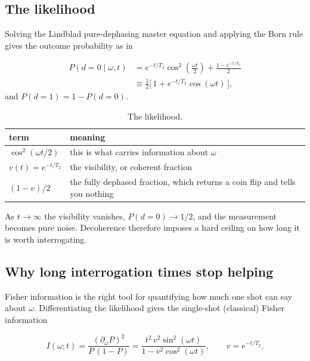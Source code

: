 \documentclass[12pt,a4paper]{article}
\begin{document}
\subsection{The likelihood}
\label{sec:the-likelihood}
Solving the Lindblad pure-dephasing master equation and applying the Born rule gives the outcome
probability as in  %

\begin{align}
P(d=0 \mid \omega, t)
  &= e^{-t/T_2}\cos^{2}\!\left(\frac{\omega t}{2}\right) + \frac{1 - e^{-t/T_2}}{2} \nonumber \\
  &\equiv \frac{1}{2}\bigl[\, 1 + e^{-t/T_2}\cos(\omega t) \,\bigr],
\label{eq:likelihood}
\end{align}
and $P(d=1) = 1 - P(d=0)$. 
\begin{table}[H]
  \centering
  \caption{The likelihood.}
  \label{tab:the-likelihood}
  \small
  \begin{tabular}{ll}
  \toprule
  term & meaning \\
  \midrule
  $\cos^2(\omega t/2)$ & this is what carries information about $\omega$ \\
  $v(t) = e^{-t/T_2}$ & the visibility, or coherent fraction \\
  $(1-v)/2$ & the fully dephased fraction, which returns a coin flip and tells you nothing \\
  \bottomrule
  \end{tabular}
\end{table}
As $t \to \infty$ the visibility vanishes, $P(d=0) \to 1/2$, and the measurement becomes pure noise.
Decoherence therefore imposes a hard ceiling on how long it is worth interrogating.




\subsection{Why long interrogation times stop helping}
\label{sec:aside-why-long-interrogation-times-stop-helping}
Fisher information is the right tool for quantifying how much one shot can say about $\omega$.
Differentiating the likelihood gives the single-shot (classical) Fisher information

\begin{equation}
I(\omega; t) = \frac{\left(\partial_\omega P\right)^2}{P\,(1-P)}
  = \frac{t^2\,v^2\sin^2(\omega t)}{1 - v^2\cos^2(\omega t)},
\qquad v = e^{-t/T_2}.
\label{eq:fisher-info}
\end{equation}
\end{document}
